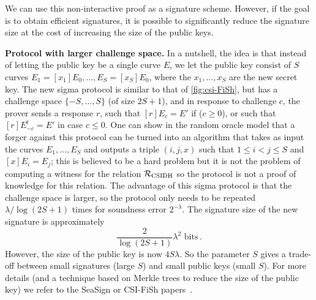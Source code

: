 We can use this non-interactive proof as a signature scheme. However, if the goal is to obtain efficient signatures, it is possible to significantly reduce the signature size at the cost of increasing the size of the public keys.

{\bf Protocol with larger challenge space.} \label{sec:multiple_keys} In a nutshell, the idea is that instead of letting the public key be a single curve $E$, we let the public key consist of $S$ curves $E_1 = [x_1]E_0, \dots, E_S = [x_S]E_0$, where the $x_1, \dots, x_S$ are the new secret key. The new sigma protocol is similar to that of \cref{fig:csi-FiSh}, but has a challenge space $\{-S,\dots,S\}$ (of size $2S+1$), and in response to challenge $c$, the prover sends a response $r$, such that $[r]E_c = E'$ if ($c \ge 0$), or such that $[r]E_{-c}^t = E'$ in case $c \leq 0$. 
One can show in the random oracle model that a forger against this protocol can be turned into an algorithm that takes as input the curves $E_1, \dots, E_S$ and outputs a triple $(i,j,x)$ such that $1 \le i < j \le S$ and $[x]E_i = E_j$; this is believed to be a hard problem but it is not the problem of computing a witness for the relation $\R[CSIDH]$ so the protocol is not a proof of knowledge for this relation.
The advantage of this sigma protocol is that the challenge space is larger, so the protocol only needs to be repeated $\lambda/\log(2S+1)$ times for soundness error $2^{-\lambda}$. The signature size of the new signature is approximately \[
\frac{2}{\log(2S+1)} \lambda^2 \text{ bits} \,.
\]
However, the size of the public key is now $4S \lambda$. So the parameter $S$ gives a trade-off between small signatures (large $S$) and small public keys (small $S$). For more details (and a technique based on Merkle trees to reduce the size of the public key) we refer to the SeaSign or CSI-FiSh papers~\cite{SeaSign,CSI-FiSh}.


